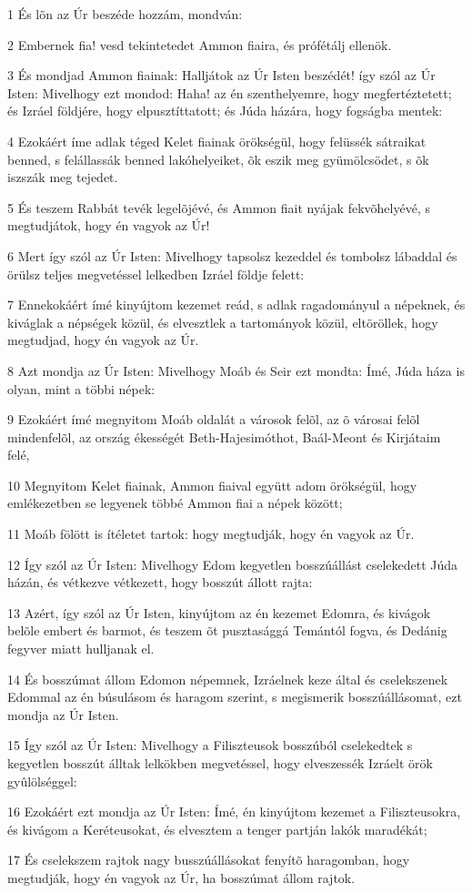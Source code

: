 \par 1 És lõn az Úr beszéde hozzám, mondván:
\par 2 Embernek fia! vesd tekintetedet Ammon fiaira, és prófétálj ellenök.
\par 3 És mondjad Ammon fiainak: Halljátok az Úr Isten beszédét! így szól az Úr Isten: Mivelhogy ezt mondod: Haha! az én  szenthelyemre, hogy megfertéztetett; és Izráel földjére, hogy elpusztíttatott; és Júda házára, hogy fogságba mentek:
\par 4 Ezokáért íme adlak téged Kelet fiainak örökségül, hogy felüssék sátraikat benned, s felállassák benned lakóhelyeiket, õk eszik meg gyümölcsödet, s õk iszszák meg tejedet.
\par 5 És teszem Rabbát tevék legelõjévé, és Ammon fiait nyájak fekvõhelyévé, s megtudjátok, hogy én vagyok az Úr!
\par 6 Mert így szól az Úr Isten: Mivelhogy tapsolsz kezeddel és tombolsz lábaddal és örülsz teljes megvetéssel lelkedben Izráel földje felett:
\par 7 Ennekokáért ímé kinyújtom kezemet reád, s adlak ragadományul a népeknek, és kiváglak a népségek közül, és elvesztlek a tartományok közül, eltöröllek, hogy megtudjad, hogy én vagyok az Úr.
\par 8 Azt mondja az Úr Isten: Mivelhogy Moáb és Seir ezt mondta: Ímé, Júda háza is olyan,  mint a többi népek:
\par 9 Ezokáért ímé megnyitom Moáb oldalát a városok felõl, az õ városai felõl mindenfelõl, az ország ékességét Beth-Hajesimóthot, Baál-Meont és Kirjátaim felé,
\par 10 Megnyitom Kelet fiainak, Ammon fiaival együtt adom örökségül, hogy emlékezetben se legyenek többé Ammon fiai a népek között;
\par 11 Moáb fölött is ítéletet tartok: hogy megtudják, hogy én vagyok az Úr.
\par 12 Így szól az Úr Isten: Mivelhogy Edom kegyetlen bosszúállást cselekedett Júda házán, és vétkezve vétkezett, hogy bosszút állott rajta:
\par 13 Azért, így szól az Úr Isten, kinyújtom az én kezemet Edomra, és kivágok belõle embert és barmot, és teszem õt pusztasággá Temántól fogva, és Dedánig fegyver miatt hulljanak el.
\par 14 És bosszúmat állom Edomon népemnek, Izráelnek keze által és cselekszenek Edommal az én búsulásom és haragom szerint, s megismerik bosszúállásomat, ezt mondja az Úr Isten.
\par 15 Így szól az Úr Isten: Mivelhogy a Filiszteusok bosszúból cselekedtek s kegyetlen bosszút álltak lelkökben megvetéssel, hogy elveszessék Izráelt örök gyûlölséggel:
\par 16 Ezokáért ezt mondja az Úr Isten: Ímé, én kinyújtom kezemet a Filiszteusokra, és kivágom a Keréteusokat, és elvesztem a tenger partján lakók maradékát;
\par 17 És cselekszem rajtok nagy busszúállásokat fenyítõ haragomban, hogy megtudják, hogy én vagyok az Úr, ha bosszúmat állom rajtok.

